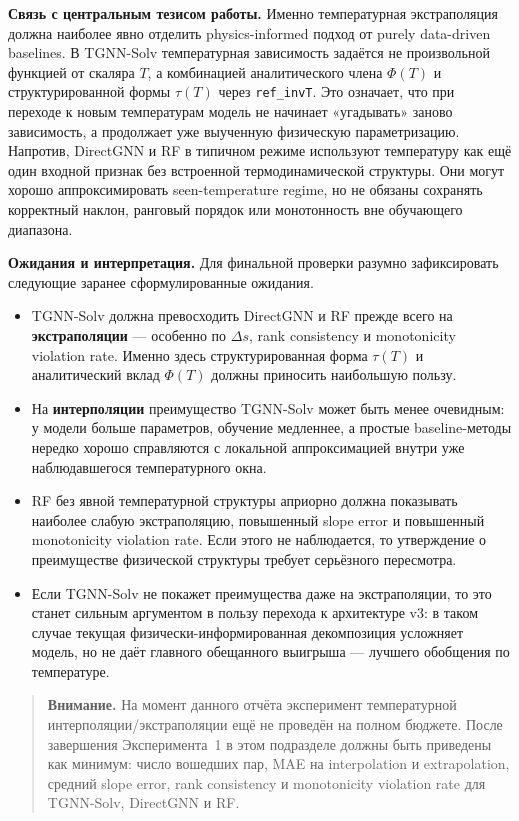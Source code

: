 \documentclass[11pt]{article}
\newcommand{\warnnote}[1]{\begin{quote}\textbf{Внимание.} #1\end{quote}}
\begin{document}
\textbf{Связь с центральным тезисом работы.} Именно температурная экстраполяция должна наиболее явно отделить physics-informed подход от purely data-driven baselines. В TGNN-Solv температурная зависимость задаётся не произвольной функцией от скаляра $T$, а комбинацией аналитического члена $\Phi(T)$ и структурированной формы $\tau(T)$ через \texttt{ref\_invT}. Это означает, что при переходе к новым температурам модель не начинает «угадывать» заново зависимость, а продолжает уже выученную физическую параметризацию. Напротив, DirectGNN и RF в типичном режиме используют температуру как ещё один входной признак без встроенной термодинамической структуры. Они могут хорошо аппроксимировать seen-temperature regime, но не обязаны сохранять корректный наклон, ранговый порядок или монотонность вне обучающего диапазона.

\textbf{Ожидания и интерпретация.} Для финальной проверки разумно зафиксировать следующие заранее сформулированные ожидания.
\begin{itemize}
  \item TGNN-Solv должна превосходить DirectGNN и RF прежде всего на \textbf{экстраполяции} --- особенно по $\Delta s$, rank consistency и monotonicity violation rate. Именно здесь структурированная форма $\tau(T)$ и аналитический вклад $\Phi(T)$ должны приносить наибольшую пользу.
  \item На \textbf{интерполяции} преимущество TGNN-Solv может быть менее очевидным: у модели больше параметров, обучение медленнее, а простые baseline-методы нередко хорошо справляются с локальной аппроксимацией внутри уже наблюдавшегося температурного окна.
  \item RF без явной температурной структуры априорно должна показывать наиболее слабую экстраполяцию, повышенный slope error и повышенный monotonicity violation rate. Если этого не наблюдается, то утверждение о преимуществе физической структуры требует серьёзного пересмотра.
  \item Если TGNN-Solv не покажет преимущества даже на экстраполяции, то это станет сильным аргументом в пользу перехода к архитектуре v3: в таком случае текущая физически-информированная декомпозиция усложняет модель, но не даёт главного обещанного выигрыша --- лучшего обобщения по температуре.
\end{itemize}

\warnnote{На момент данного отчёта эксперимент температурной интерполяции/экстраполяции ещё не проведён на полном бюджете. После завершения Эксперимента~1 в этом подразделе должны быть приведены как минимум: число вошедших пар, MAE на interpolation и extrapolation, средний slope error, rank consistency и monotonicity violation rate для TGNN-Solv, DirectGNN и RF.}
\end{document}
